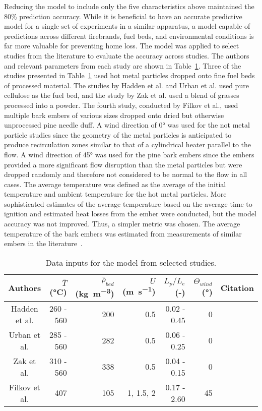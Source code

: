     Reducing the model to include only the five characteristics above maintained the 80\% prediction accuracy. While it is beneficial to have an accurate predictive model for a single set of experiments in a similar apparatus, a model capable of predictions across different firebrands, fuel beds, and environmental conditions is far more valuable for preventing home loss. The model was applied to select studies from the literature to evaluate the accuracy across studies. The authors and relevant parameters from each study are shown in Table~\ref{tab:otherStudies}. Three of the studies presented in Table~\ref{tab:otherStudies} used hot metal particles dropped onto fine fuel beds of processed material. The studies by Hadden et al. and Urban et al. used pure cellulose as the fuel bed, and the study by Zak et al. used a blend of grasses processed into a powder. The fourth study, conducted by Filkov et al., used multiple bark embers of various sizes dropped onto dried but otherwise unprocessed pine needle duff. A wind direction of 0\si{\degree} was used for the not metal particle studies since the geometry of the metal particles is anticipated to produce recirculation zones similar to that of a cylindrical heater parallel to the flow. A wind direction of 45\si{\degree} was used for the pine bark embers since the embers provided a more significant flow disruption than the metal particles but were dropped randomly and therefore not considered to be normal to the flow in all cases. The average temperature was defined as the average of the initial temperature and ambient temperature for the hot metal particles. More sophisticated estimates of the average temperature based on the average time to ignition and estimated heat losses from the ember were conducted, but the model accuracy was not improved. Thus, a simpler metric was chosen. The average temperature of the bark embers was estimated from measurements of similar embers in the literature~\cite{Fateev2017a, Matvienko2018}.
        \begin{table}[hbpt]
            \centering
            \caption{Data inputs for the model from selected studies.}
            \begin{tabular}{crrrrrc}
                Authors & $\bar{T}$ (\si{\celsius}) &  $\bar{\rho}_{bed}$ (\si{\kilo\gram\per\cubic\meter})& $U$ (\si{\meter\per\second}) & $L_{p}/L_{e}$ (-)& $\Theta_{wind}$ (\si{\degree}) & Citation\\
                \hline
                 Hadden et al. & 260 - 560 & 200 & 0.5       & 0.02 - 0.45 & 0  & \cite{Hadden2011}\\
                 Urban et al.  & 285 - 560 & 282 & 0.5       & 0.06 - 0.25 & 0  & \cite{Urban2018}\\
                 Zak et al.    & 310 - 560 & 338 & 0.5       & 0.04 - 0.15 & 0  & \cite{Zak2014} \\
                 Filkov et al. & 407       & 105 & 1, 1.5, 2 & 0.17 - 2.60 & 45 & \cite{Filkov2016}
            \end{tabular}
            \label{tab:otherStudies}
        \end{table}
